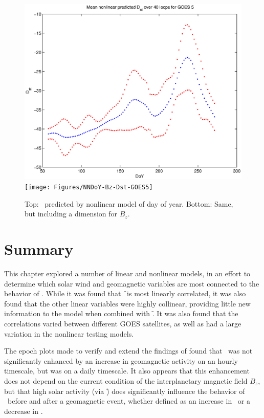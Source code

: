 \begin{figure}[htp!]
	\centering
	\includegraphics[width=0.7\linewidth]{Figures/NNDoY-Dst-GOES5}	
	\texttt{[image: Figures/NNDoY-Bz-Dst-GOES5]}
	\caption{Top: \dst\ predicted by nonlinear model of day of year. Bottom: Same, but including a dimension for $B_z$.}
	\label{fig:DoYDst}
\end{figure}

\section{Summary}
This chapter explored a number of linear and nonlinear models, in an effort to determine which solar wind and geomagnetic variables are most connected to the behavior of \req. While it was found that \f\ is most linearly correlated, it was also found that the other linear variables were highly collinear, providing little new information to the model when combined with \f.  It was also found that the correlations varied between different GOES satellites, as well as had a large variation in the nonlinear testing models. 

The epoch plots made to verify and extend the findings of \cite{Takahashi2010SolarCycleVariation} found that \req\ was not significantly enhanced by an increase in geomagnetic activity on an hourly timescale, but was on a daily timescale. It also appears that this enhancement does not depend on the current condition of the interplanetary magnetic field $B_z$, but that high solar activity (via \f) does significantly influence the behavior of \req\ before and after a geomagnetic event, whether defined as an increase in \req\ or a decrease in \dst.


